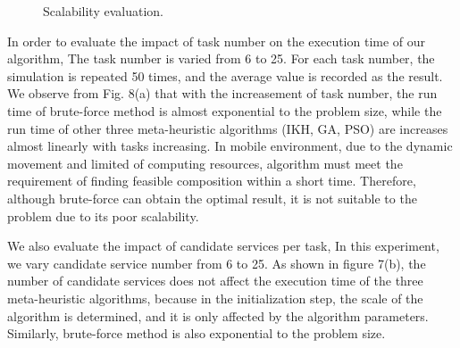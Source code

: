 \documentclass[10pt,journal,compsoc]{IEEEtran}
\begin{document}
\begin{figure}[!t]
\centering
{}
\hfil
{}

\caption{Scalability evaluation.} \label{fig_sim}
\end{figure}

In order to evaluate the impact of task number on the execution time of our algorithm, The task number is varied from 6 to 25. For each task number, the simulation is repeated 50 times, and the average value is recorded as the result. We observe from Fig. 8(a) that with the increasement of task number, the run time of brute-force method is almost exponential to the problem size, while the run time of other three meta-heuristic algorithms (IKH, GA, PSO) are increases almost linearly with tasks increasing. In mobile environment, due to the dynamic movement and limited of computing resources, algorithm must meet the requirement of finding feasible composition within a short time. Therefore, although brute-force can obtain the optimal result, it is not suitable to the problem due to its poor scalability. 

We also evaluate the impact of candidate services per task, In this experiment, we vary candidate service number from 6 to 25. As shown in figure 7(b), the number of candidate services does not affect the execution time of the three meta-heuristic algorithms, because in the initialization step, the scale of the algorithm is determined, and it is only affected by the algorithm parameters. Similarly, brute-force method is also exponential to the problem size. 
\end{document}
